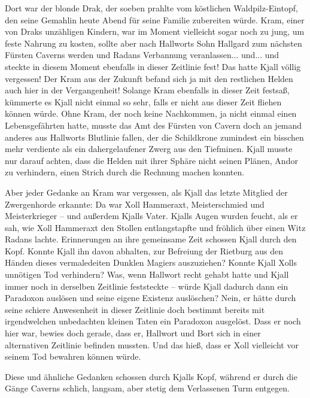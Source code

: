 Dort war der blonde Drak, der soeben prahlte vom köstlichen Waldpilz-Eintopf, den seine Gemahlin heute Abend für seine Familie zubereiten würde. Kram, einer von Draks unzähligen Kindern, war im Moment vielleicht sogar noch zu jung, um feste Nahrung zu kosten, sollte aber nach Hallworts Sohn Hallgard zum nächsten Fürsten Caverns werden und Radans Verbannung veranlassen... und... und steckte in diesem Moment ebenfalls in dieser Zeitlinie fest! Das hatte Kjall völlig vergessen! Der Kram aus der Zukunft befand sich ja mit den restlichen Helden auch hier in der Vergangenheit! Solange Kram ebenfalls in dieser Zeit festsaß, kümmerte es Kjall nicht einmal so sehr, falls er nicht aus dieser Zeit fliehen können würde. Ohne Kram, der noch keine Nachkommen, ja nicht einmal einen Lebensgefährten hatte, musste das Amt des Fürsten von Cavern doch an jemand anderes aus Hallworts Blutlinie fallen, der die Schildkrone zumindest ein bisschen mehr verdiente als ein dahergelaufener Zwerg aus den Tiefminen. Kjall musste nur darauf achten, dass die Helden mit ihrer Sphäre nicht seinen Plänen, Andor zu verhindern, einen Strich durch die Rechnung machen konnten.

Aber jeder Gedanke an Kram war vergessen, als Kjall das letzte Mitglied der Zwergenhorde erkannte: Da war Xoll Hammeraxt, Meisterschmied und Meisterkrieger – und außerdem Kjalls Vater. Kjalls Augen wurden feucht, als er sah, wie Xoll Hammeraxt den Stollen entlangstapfte und fröhlich über einen Witz Radans lachte. Erinnerungen an ihre gemeinsame Zeit schossen Kjall durch den Kopf. Konnte Kjall ihn davon abhalten, zur Befreiung der Rietburg aus den Händen dieses vermaledeiten Dunklen Magiers auszuziehen? Konnte Kjall Xolls unnötigen Tod verhindern? Was, wenn Hallwort recht gehabt hatte und Kjall immer noch in derselben Zeitlinie feststeckte – würde Kjall dadurch dann ein Paradoxon auslösen und seine eigene Existenz auslöschen? Nein, er hätte durch seine schiere Anwesenheit in dieser Zeitlinie doch bestimmt bereits mit irgendwelchen unbedachten kleinen Taten ein Paradoxon ausgelöst. Dass er noch hier war, bewies doch gerade, dass er, Hallwort und Bort sich in einer alternativen Zeitlinie befinden mussten. Und das hieß, dass er Xoll vielleicht vor seinem Tod bewahren können würde.

Diese und ähnliche Gedanken schossen durch Kjalls Kopf, während er durch die Gänge Caverns schlich, langsam, aber stetig dem Verlassenen Turm entgegen.\bigskip



